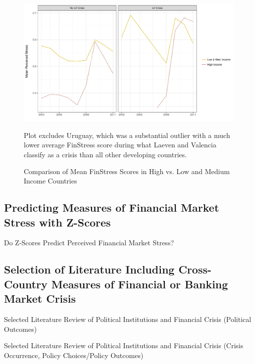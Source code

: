 \documentclass[]{article}
\begin{document}
\begin{figure}
    \caption{Comparison of Mean FinStress Scores in High vs. Low and Medium Income Countries}
    \label{comp_dev_developing}

    \begin{center}
        \includegraphics[scale=0.55]{figures/dev_vs_developing.pdf}
    \end{center}
    {\scriptsize{Plot excludes Uruguay, which was a substantial outlier with a much lower average FinStress score during what Laeven and Valencia classify as a crisis than all other developing countries.}}
\end{figure}

\subsection*{Predicting Measures of Financial Market Stress with Z-Scores}

\begin{table}[H]
    \caption{Do Z-Scores Predict Perceived Financial Market Stress?}
    \label{epfms_z_regress}

    \begin{center}
    {\tiny{
        
    }}
    \end{center}
\end{table}

\subsection*{Selection of Literature Including Cross-Country Measures of Financial or Banking Market Crisis}

\begin{table}[H]
\caption{Selected Literature Review of Political Institutions and Financial
Crisis (Political Outcomes)}


\label{LitRevTable2}
\begin{center}

\vspace{0.5cm}
{\tiny{

}}
\end{center}
\end{table}

\begin{table}[H]
\caption{Selected Literature Review of Political Institutions and Financial
Crisis (Crisis Occurrence, Policy Choices/Policy Outcomes)}


\label{LitRevTable}
\begin{center}

\vspace{0.5cm}
{\tiny{

}}
\end{center}
\end{table}
\end{document}
